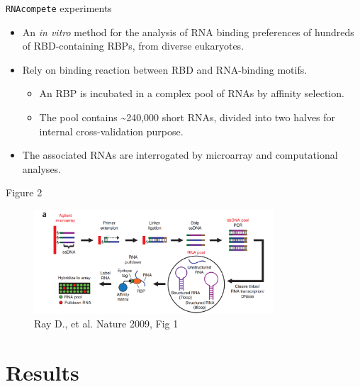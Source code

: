 \documentclass[professionalfont, 12pt, default]{beamer}
\providecommand{\tightlist}{%
    \setlength{\itemsep}{0pt}\setlength{\parskip}{0pt}}
\begin{document}
\begin{frame}{\texttt{RNAcompete} experiments}

\begin{itemize}
\tightlist
\item
  An \emph{in vitro} method for the analysis of RNA binding preferences
  of hundreds of RBD-containing RBPs, from diverse eukaryotes.
\item
  Rely on binding reaction between RBD and RNA-binding motifs.

  \begin{itemize}
  \tightlist
  \item
    An RBP is incubated in a complex pool of RNAs by affinity selection.
  \item
    The pool contains \textasciitilde{}240,000 short RNAs, divided into
    two halves for internal cross-validation purpose.
  \end{itemize}
\item
  The associated RNAs are interrogated by microarray and computational
  analyses.
\end{itemize}

\end{frame}

\begin{frame}{Figure 2}

\begin{figure}
\centering
\includegraphics[width=0.80000\textwidth]{img/RNAcompete.png}
\caption{Ray D., et al. Nature 2009, Fig 1}
\end{figure}

\end{frame}

\section{Results}\label{results}
\end{document}
